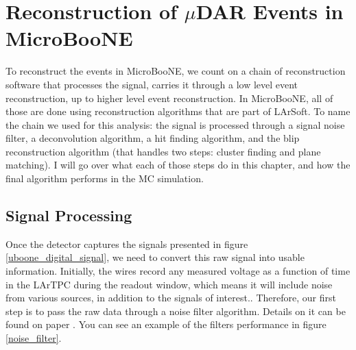 \newpage
\section{Reconstruction of $\mu$DAR Events in MicroBooNE}

To reconstruct the events in MicroBooNE, we count on a chain of reconstruction software that processes the signal, carries it through a low level event reconstruction, up to higher level event reconstruction. In MicroBooNE, all of those are done using reconstruction algorithms that are part of LArSoft. To name the chain we used for this analysis: the signal is processed through a signal noise filter, a deconvolution algorithm, a hit finding algorithm, and the blip reconstruction algorithm (that handles two steps: cluster finding and plane matching). I will go over what each of those steps do in this chapter, and how the final algorithm performs in the MC simulation.  

\subsection{Signal Processing}

Once the detector captures the signals presented in figure \ref{uboone_digital_signal}, we need to convert this raw signal into usable information. 
Initially, the wires record any measured voltage as a function of time in the LArTPC during the readout window, which means it will include noise from various sources, in addition to the signals of interest.. Therefore, our first step is to pass the raw data through a noise filter algorithm. Details on it can be found on paper \cite{noise_filter}. You can see an example of the filters performance in figure \ref{noise_filter}. 

